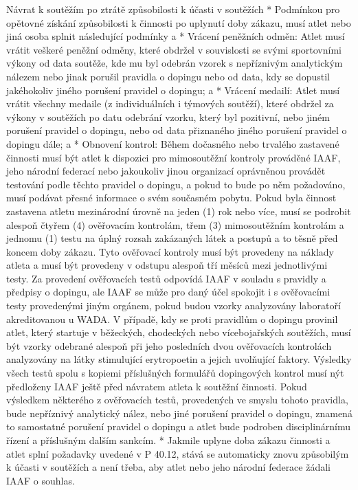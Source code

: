 Návrat k soutěžím po ztrátě způsobilosti k účasti v soutěžích
* Podmínkou pro opětovné získání způsobilosti k činnosti po uplynutí doby zákazu, musí atlet nebo jiná osoba splnit následující podmínky
  \begitems \style a
  * Vrácení peněžních odměn: Atlet musí vrátit veškeré peněžní odměny, které obdržel v souvislosti se svými sportovními výkony od data soutěže, kde mu byl odebrán vzorek s nepříznivým analytickým nálezem nebo jinak porušil pravidla o dopingu nebo od data, kdy se dopustil jakéhokoliv jiného porušení pravidel o dopingu; a
  * Vrácení medailí: Atlet musí vrátit všechny medaile (z individuálních i týmových soutěží), které obdržel za výkony v soutěžích po datu odebrání vzorku, který byl pozitivní, nebo jiném porušení pravidel o dopingu, nebo od data přiznaného jiného porušení pravidel o dopingu dále; a
  * Obnovení kontrol: Během dočasného nebo trvalého zastavené činnosti musí být atlet k dispozici pro mimosoutěžní kontroly prováděné IAAF, jeho národní federací nebo jakoukoliv jinou organizací oprávněnou provádět testování podle těchto pravidel o dopingu, a pokud to bude po něm požadováno, musí podávat přesné informace o svém současném pobytu. Pokud byla činnost zastavena atletu mezinárodní úrovně na jeden (1) rok nebo více, musí se podrobit alespoň čtyřem (4) ověřovacím kontrolám, třem (3) mimosoutěžním kontrolám a jednomu (1) testu na úplný rozsah zakázaných látek a postupů a to těsně před koncem doby zákazu. Tyto ověřovací kontroly musí být provedeny na náklady atleta a musí být provedeny v odstupu alespoň tří měsíců mezi jednotlivými testy. Za provedení ověřovacích testů odpovídá IAAF v souladu s pravidly a předpisy o dopingu, ale IAAF se může pro daný účel spokojit i s ověřovacími testy provedenými jiným orgánem, pokud budou vzorky analyzovány laboratoří akreditovanou u WADA. V případě, kdy se proti pravidlům o dopingu provinil atlet, který startuje v běžeckých, chodeckých nebo vícebojařských soutěžích, musí být vzorky odebrané alespoň při jeho posledních dvou ověřovacích kontrolách analyzovány na látky stimulující erytropoetin a jejich uvolňující faktory. Výsledky všech testů spolu s kopiemi příslušných formulářů dopingových kontrol musí nýt předloženy IAAF ještě před návratem atleta k soutěžní činnosti. Pokud výsledkem některého z ověřovacích testů, provedených ve smyslu tohoto pravidla, bude nepříznivý analytický nález, nebo jiné porušení pravidel o dopingu, znamená to samostatné porušení pravidel o dopingu a atlet bude podroben disciplinárnímu řízení a příslušným dalším sankcím.
  * Jakmile uplyne doba zákazu činnosti a atlet splní požadavky uvedené v P 40.12, stává se automaticky znovu způsobilým k účasti v soutěžích a není třeba, aby atlet nebo jeho národní federace žádali IAAF o souhlas.
  \enditems
\enditems

